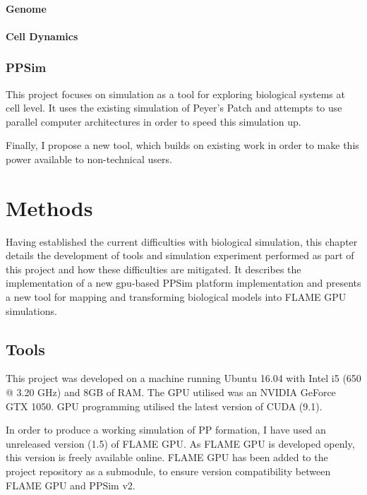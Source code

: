 \documentclass{UoYCSproject}
\begin{document}
\subsubsection{Genome}


\subsubsection{Cell Dynamics}


\subsection{PPSim}
\label{ppsim}
This project focuses on simulation as a tool for exploring biological systems at cell level. It uses the existing simulation of Peyer's Patch\cite{kieran_thesis} and attempts to use parallel computer architectures in order to speed this simulation up. %

Finally, I propose a new tool, which builds on existing work in order to make this power available to non-technical users.

\chapter{Methods}
\label{methods}

Having established the current difficulties with biological simulation, this chapter details the development of tools and simulation experiment performed as part of this project and how these difficulties are mitigated.
It describes the implementation of a new \acrshort{gpu}-based PPSim platform implementation and presents a new tool for mapping and transforming biological models into \gls{FLAME GPU} simulations.

\section{Tools}
This project was developed on a machine running Ubuntu 16.04 with Intel i5 (650 @ 3.20 GHz) and 8GB of RAM.
The GPU utilised was an NVIDIA GeForce GTX 1050.
GPU programming utilised the latest version of CUDA (9.1).

In order to produce a working simulation of \gls{PP} formation, I have used an unreleased version (1.5) of \gls{FLAME GPU}.
As \gls{FLAME GPU} is developed openly, this version is freely available online\cite{flame_github}.
\gls{FLAME GPU} has been added to the project repository as a submodule, to ensure version compatibility between \gls{FLAME GPU} and PPSim v2.
\end{document}
